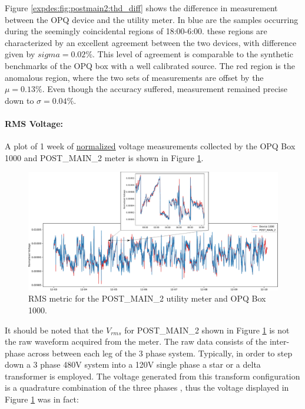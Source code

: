 Figure \ref{expdes:fig:postmain2:thd_diff} shows the difference in measurement between the OPQ device and the utility meter.
In blue are the samples occurring during the seemingly coincidental regions of 18:00-6:00.
these regions are characterized by an excellent agreement between the two devices, with difference given by $sigma =0.02\%$.
This level of agreement is comparable to the synthetic benchmarks of the OPQ box with a well calibrated source.
The red region is the anomalous region, where the two sets of measurements are offset by the $\mu = 0.13\%$.
Even though the accuracy suffered, measurement remained precise down to $\sigma=0.04\%$.

\paragraph{RMS Voltage:}
A plot of 1 week of \underline{normalized} voltage measurements collected by the OPQ Box 1000 and POST\_MAIN\_2 meter is shown in Figure \ref{expdes:fig:postmain2:rms}.

\begin{figure}[ht!]
    \centering
    \includegraphics[width=1\linewidth]{img/napali_eval/gt/gt_rms.pdf}
    \caption{RMS metric for the POST\_MAIN\_2 utility meter and OPQ Box 1000.}
    \label{expdes:fig:postmain2:rms}
\end{figure}

It should be noted that the $V_{rms}$ for POST\_MAIN\_2 shown in Figure \ref{expdes:fig:postmain2:rms} is not the raw waveform acquired from the meter.
The raw data consists of the inter-phase across between each leg of the 3 phase system.
Typically, in order to step down a 3 phase 480V system into a 120V single phase a star or a delta transformer is employed.
The voltage generated from this transform configuration is a quadrature combination of the three phases \cite{Horowitz:2015:AE:2960712}, thus the voltage displayed in Figure \ref{expdes:fig:postmain2:rms} was in fact:

